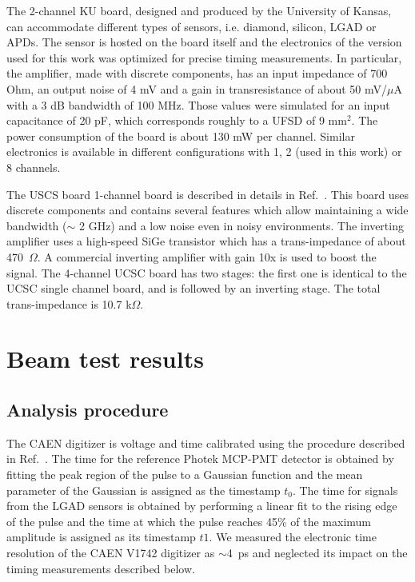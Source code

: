 \documentclass[preprint,1p]{elsarticle}
\begin{document}
The 2-channel KU board, designed and produced by the University of Kansas, can
accommodate different types of sensors, i.e. diamond, silicon, LGAD or APDs. The
sensor is hosted on the board itself and the electronics of the version used for
this work was optimized for precise timing measurements. In particular, the
amplifier, made with discrete components, has an input impedance of 700 Ohm, an
output noise of 4 mV and a gain in transresistance of about 50 mV/$\mu$A with
a 3 dB bandwidth of 100 MHz. Those values were simulated for an input
capacitance of 20 pF, which corresponds roughly to a UFSD of 9 mm$^2$. The power
consumption of the board is about 130 mW per channel. Similar electronics is
available in different configurations with 1, 2 (used in this work) or 8
channels.

The USCS board 1-channel board is described in details in
Ref.~\cite{Cartiglia201783}. This board uses discrete components and contains
several features which allow maintaining a wide bandwidth ($\sim$ 2 GHz) and a
low noise even in noisy environments. The inverting amplifier uses a high-speed
SiGe transistor which has a trans-impedance of about 470~$\Omega$. A commercial
inverting amplifier with gain 10x is used to boost the signal. The 4-channel
UCSC board has two stages: the first one is identical to the UCSC single channel
board, and is followed by an inverting stage. The total trans-impedance is 10.7
k$\Omega$.



\section{Beam test results}
\label{sec:results}

\subsection{Analysis procedure}

The CAEN digitizer is voltage and time calibrated using the procedure described
in Ref.~\cite{Kim201467}. The time for the reference Photek MCP-PMT detector is
obtained by fitting the peak region of the pulse to a Gaussian function and the
mean parameter of the Gaussian is assigned as the timestamp $t_0$. The time for
signals from the LGAD sensors is obtained by performing a linear fit to the
rising edge of the pulse and the time at which the pulse reaches 45\% of the
maximum amplitude is assigned as its timestamp $t1$. We measured the electronic
time resolution of the CAEN V1742 digitizer as $\sim$4~ps and neglected its
impact on the timing measurements described below. 
\end{document}
